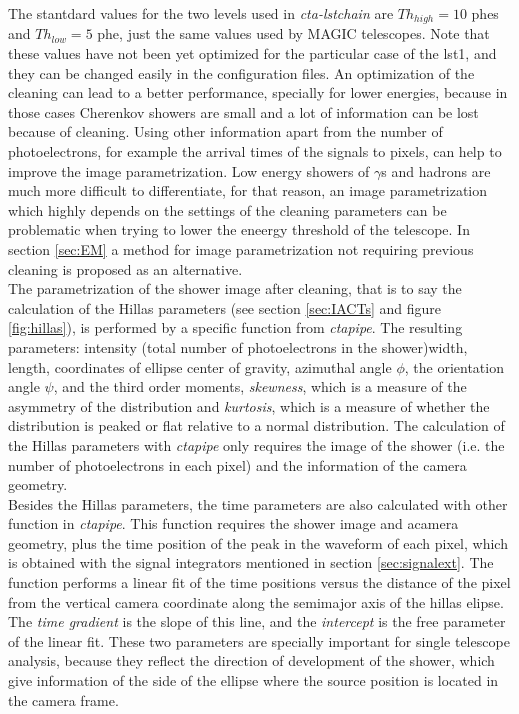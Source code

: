 \documentclass[main.tex]{subfiles}
\begin{document}
   The stantdard values for the two levels used in \textit{cta-lstchain} are $Th_{high} = 10$ phes and $Th_{low} = 5$ phe, just the same values used by MAGIC telescopes. Note that these values have not been yet optimized for the particular case of the \gls{lst}1, and they can be changed easily in the configuration files. An optimization of the cleaning can lead to a better performance, specially for lower energies, because in those cases Cherenkov showers are small and a lot of information can be lost because of cleaning. Using other information apart from the number of photoelectrons, for example the arrival times of the signals to pixels, can help to improve the image parametrization. Low energy showers of $\gamma$s and hadrons are much more difficult to differentiate, for that reason, an image parametrization which highly depends on the settings of the cleaning parameters can be problematic when trying to lower the eneergy threshold of the telescope. In section \ref{sec:EM} a method for image parametrization not requiring previous cleaning is proposed as an alternative.\\
   The parametrization of the shower image after cleaning, that is to say the calculation of the Hillas parameters (see section \ref{sec:IACTs} and figure \ref{fig:hillas}), is performed by a specific function from \textit{ctapipe}. The resulting parameters: intensity (total number of photoelectrons in the shower)width, length, coordinates of ellipse center of gravity, azimuthal angle $\phi$, the orientation angle $\psi$, and the third order moments, \textit{skewness}, which is a measure of the asymmetry of the distribution and \textit{kurtosis}, which is a measure of whether the distribution is peaked or flat relative to a normal distribution. The calculation of the Hillas parameters with \textit{ctapipe} only requires the image of the shower (i.e. the number of photoelectrons in each pixel) and the information of the camera geometry.\\
   Besides the Hillas parameters, the time parameters are also calculated with other function in \textit{ctapipe}. This function requires the shower image and acamera geometry, plus the time position of the peak in the waveform of each pixel, which is obtained with the signal integrators mentioned in section \ref{sec:signalext}. The function performs a linear fit of the time positions versus the distance of the pixel from the vertical camera coordinate along the semimajor axis of the hillas elipse. The \textit{time gradient} is the slope of this line, and the \textit{intercept} is the free parameter of the linear fit. These two parameters are specially important for single telescope analysis, because they reflect the direction of development of the shower, which give information of the side of the ellipse where the source position is located in the camera frame.\\
\end{document}
